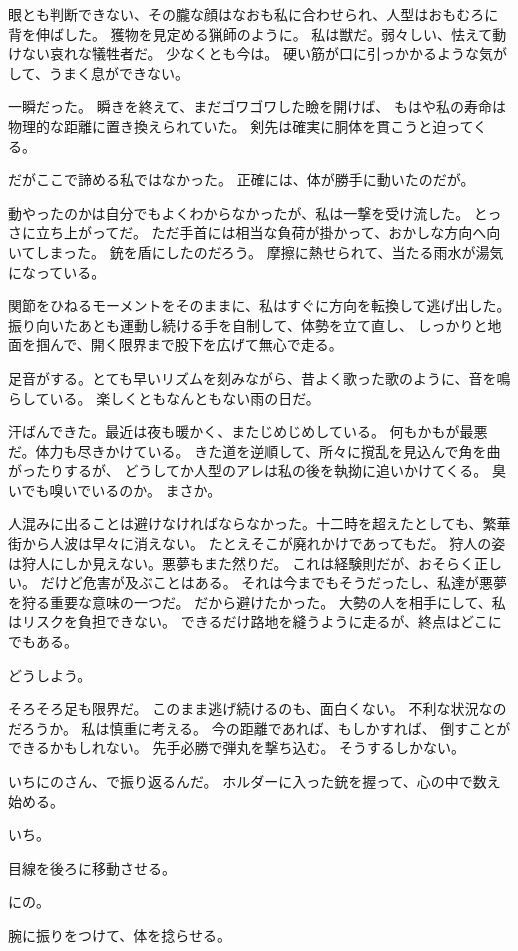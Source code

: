 \documentclass[../IHMain]{subfiles}
\begin{document}
眼とも判断できない、その朧な顔はなおも私に合わせられ、人型はおもむろに背を伸ばした。
獲物を見定める猟師のように。
私は獣だ。弱々しい、怯えて動けない哀れな犠牲者だ。
少なくとも今は。
硬い筋が口に引っかかるような気がして、うまく息ができない。

一瞬だった。
瞬きを終えて、まだゴワゴワした瞼を開けば、
もはや私の寿命は物理的な距離に置き換えられていた。
剣先は確実に胴体を貫こうと迫ってくる。

だがここで諦める私ではなかった。
正確には、体が勝手に動いたのだが。

動やったのかは自分でもよくわからなかったが、私は一撃を受け流した。
とっさに立ち上がってだ。
ただ手首には相当な負荷が掛かって、おかしな方向へ向いてしまった。
銃を盾にしたのだろう。
摩擦に熱せられて、当たる雨水が湯気になっている。

関節をひねるモーメントをそのままに、私はすぐに方向を転換して逃げ出した。
振り向いたあとも運動し続ける手を自制して、体勢を立て直し、
しっかりと地面を掴んで、開く限界まで股下を広げて無心で走る。

足音がする。とても早いリズムを刻みながら、昔よく歌った歌のように、音を鳴らしている。
楽しくともなんともない雨の日だ。

汗ばんできた。最近は夜も暖かく、またじめじめしている。
何もかもが最悪だ。体力も尽きかけている。
きた道を逆順して、所々に撹乱を見込んで角を曲がったりするが、
どうしてか人型のアレは私の後を執拗に追いかけてくる。
臭いでも嗅いでいるのか。
まさか。

人混みに出ることは避けなければならなかった。十二時を超えたとしても、繁華街から人波は早々に消えない。
たとえそこが廃れかけであってもだ。
狩人の姿は狩人にしか見えない。悪夢もまた然りだ。
これは経験則だが、おそらく正しい。
だけど危害が及ぶことはある。
それは今までもそうだったし、私達が悪夢を狩る重要な意味の一つだ。
だから避けたかった。
大勢の人を相手にして、私はリスクを負担できない。
できるだけ路地を縫うように走るが、終点はどこにでもある。

どうしよう。

そろそろ足も限界だ。
このまま逃げ続けるのも、面白くない。
不利な状況なのだろうか。
私は慎重に考える。
今の距離であれば、もしかすれば、
倒すことができるかもしれない。
先手必勝で弾丸を撃ち込む。
そうするしかない。

いちにのさん、で振り返るんだ。
ホルダーに入った銃を握って、心の中で数え始める。

いち。

目線を後ろに移動させる。

にの。

腕に振りをつけて、体を捻らせる。
\end{document}
